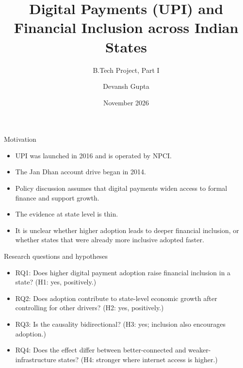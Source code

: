 \documentclass[aspectratio=169,11pt]{beamer}
\title{Digital Payments (UPI) and Financial Inclusion across Indian States}
\subtitle{B.Tech Project, Part I}
\author{Devansh Gupta}
\institute{Supervisor: Prof. Rudra Prakash Pradhan (VGSOM)\\IIT Kharagpur}
\date{November 2026}
\begin{document}
\begin{frame}[plain]
\titlepage
\end{frame}

\begin{frame}{Motivation}
\begin{itemize}
\item UPI was launched in 2016 and is operated by NPCI. %
\item The Jan Dhan account drive began in 2014. %
\item Policy discussion assumes that digital payments widen access to formal finance and support growth. %
\item The evidence at state level is thin. %
\item It is unclear whether higher adoption leads to deeper financial inclusion, or whether states that were already more inclusive adopted faster. %
\end{itemize}
\end{frame}

\begin{frame}{Research questions and hypotheses}
\begin{itemize}
\item RQ1: Does higher digital payment adoption raise financial inclusion in a state? (H1: yes, positively.)
\item RQ2: Does adoption contribute to state-level economic growth after controlling for other drivers? (H2: yes, positively.)
\item RQ3: Is the causality bidirectional? (H3: yes; inclusion also encourages adoption.)
\item RQ4: Does the effect differ between better-connected and weaker-infrastructure states? (H4: stronger where internet access is higher.)
\end{itemize}
\end{frame}
\end{document}
